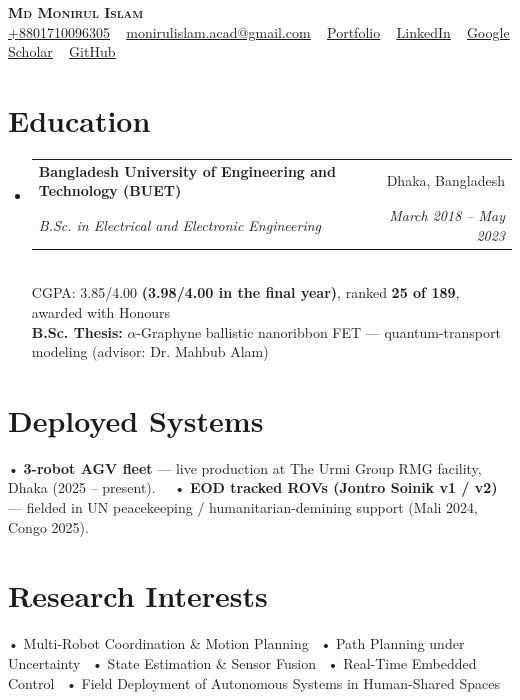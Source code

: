 \documentclass[a4paper,20pt]{article}
\makeatletter
\newcommand{\resumeSubheading}[4]{
  \vspace{-1pt}\item
    \begin{tabular*}{0.97\textwidth}{l@{\extracolsep{\fill}}r}
      \textbf{#1} & #2 \\
      \textit{#3} & \textit{#4} \\
    \end{tabular*}\vspace{-5pt}
}
\newcommand{\resumeSubHeadingListStart}{\begin{itemize}[leftmargin=*]}
\newcommand{\resumeSubHeadingListEnd}{\end{itemize}}
\makeatother
\begin{document}
\begin{center}
    {\Huge \scshape \textbf{Md Monirul Islam}} \\ \vspace{2pt}
    \small
    \href{tel:8801710096305}{\underline{+8801710096305}}
    ~ \href{mailto:monirulislam.acad@gmail.com}{\underline{monirulislam.acad@gmail.com}}
    ~ \href{https://Monirul305.github.io}{\underline{Portfolio}}
    ~ \href{https://www.linkedin.com/in/monirul-islam-460001148/}{\underline{LinkedIn}}
    ~ \href{https://scholar.google.com/citations?user=m-6T5FgAAAAJ&hl=en}{\underline{Google Scholar}}
    ~ \href{https://github.com/Monirul305}{\underline{GitHub}}
\end{center}

\section{\textbf{Education}}
  \resumeSubHeadingListStart
    \resumeSubheading
      {Bangladesh University of Engineering and Technology (BUET)}{Dhaka, Bangladesh}
      {B.Sc. in Electrical and Electronic Engineering}{March 2018 -- May 2023}{{}}\\ \vspace{4pt} {CGPA: 3.85/4.00 \textbf{(3.98/4.00 in the final year)}, ranked \textbf{25 of 189}, awarded with Honours \\ \vspace{3pt} \textbf{B.Sc. Thesis:} \(\alpha\)-Graphyne ballistic nanoribbon FET --- quantum-transport modeling (advisor: Dr. Mahbub Alam)}
      {}
    \resumeSubHeadingListEnd

\section{\textbf{Deployed Systems}}
• \textbf{3-robot AGV fleet} --- live production at The Urmi Group RMG facility, Dhaka (2025 -- present).~~ • \textbf{EOD tracked ROVs (Jontro Soinik v1 / v2)} --- fielded in UN peacekeeping / humanitarian-demining support (Mali 2024, Congo 2025).

\vspace{4pt}
\section{\textbf{Research Interests}}
• Multi-Robot Coordination \& Motion Planning~ • Path Planning under Uncertainty~ • State Estimation \& Sensor Fusion~ • Real-Time Embedded Control~ • Field Deployment of Autonomous Systems in Human-Shared Spaces
\end{document}
